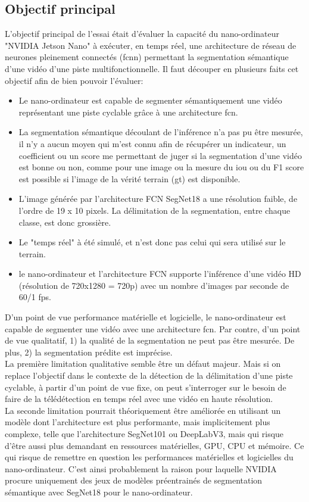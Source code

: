 ﻿\subsection{Objectif principal}
\noindent L'objectif principal de l'essai était d'évaluer la capacité du nano-ordinateur "NVIDIA Jetson Nano" à exécuter, en temps réel, une architecture de réseau de neurones pleinement connectés (\acrshort{fcnn}) permettant la segmentation sémantique d'une vidéo d'une piste multifonctionnelle. Il faut découper en plusieurs faits cet objectif afin de bien pouvoir l'évaluer: 
\begin{itemize}
   \item Le nano-ordinateur est capable de segmenter sémantiquement une vidéo représentant une piste cyclable grâce à une architecture \acrshort{fcn}. 
   \item La segmentation sémantique découlant de l'inférence n'a pas pu être mesurée, il n'y a aucun moyen qui m'est connu afin de récupérer un indicateur, un coefficient ou un score me permettant de juger si la segmentation d'une vidéo est bonne ou non, comme pour une image ou la mesure du \acrshort{iou} ou du F1 score est possible si l'image de la vérité terrain (\acrshort{gt}) est disponible. 
   \item L'image générée par l'architecture FCN SegNet18 a une résolution faible, de l'ordre de 19 x 10 pixels. La délimitation de la segmentation, entre chaque classe, est donc grossière.
   \item Le "temps réel" à été simulé, et n'est donc pas celui qui sera utilisé sur le terrain. 
   \item le nano-ordinateur et l'architecture FCN supporte l'inférence d'une vidéo HD (résolution de 720x1280 = 720p) avec un nombre d'images par seconde de 60/1 \acrshort{fps}.
\end{itemize}
\vspace{\baselineskip}
\noindent D'un point de vue performance matérielle et logicielle, le nano-ordinateur est capable de segmenter une vidéo avec une architecture \acrshort{fcn}. Par contre, d'un point de vue qualitatif, 1) la qualité de la segmentation ne peut pas être mesurée. De plus, 2) la segmentation prédite est imprécise.
\vspace{\baselineskip}
\\
\noindent La première limitation qualitative semble être un défaut majeur. Mais si on replace l'objectif dans le contexte de la détection de la délimitation d'une piste cyclable, à partir d'un point de vue fixe, on peut s'interroger sur le besoin de faire de la télédétection en temps réel avec une vidéo en haute résolution.
\vspace{\baselineskip}
\\
\noindent La seconde limitation pourrait théoriquement être améliorée en utilisant un modèle dont l'architecture est plus performante, mais implicitement plus complexe, telle que l'architecture SegNet101 ou DeepLabV3, mais qui risque d'être aussi plus demandant en ressources matérielles, GPU, CPU et mémoire. Ce qui risque de remettre en question les performances matérielles et logicielles du nano-ordinateur. C'est ainsi probablement la raison pour laquelle NVIDIA procure uniquement des jeux de modèles préentrainés de segmentation sémantique avec SegNet18 pour le nano-ordinateur. 
